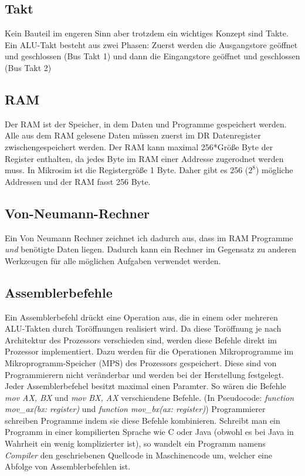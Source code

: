 \documentclass{article}
\begin{document}
\subsection*{Takt}
Kein Bauteil im engeren Sinn aber trotzdem ein wichtiges Konzept sind Takte.
Ein ALU-Takt besteht aus zwei Phasen: Zuerst werden die Ausgangstore geöffnet und geschlossen (Bus Takt 1)
und dann die Eingangstore geöffnet und geschlossen (Bus Takt 2)
\subsection*{RAM}
Der RAM ist der Speicher, in dem Daten und Programme gespeichert werden. Alle aus dem RAM gelesene Daten
müssen zuerst im DR Datenregister zwischengespeichert werden. Der RAM kann maximal 256*Größe Byte der Register 
enthalten, da jedes Byte im RAM einer Addresse zugerodnet werden muss. In Mikrosim ist die Registergröße 1 Byte.
Daher gibt es 256 ($2^8$) mögliche Addressen und der RAM fasst 256 Byte.

\subsection*{Von-Neumann-Rechner}
Ein Von Neumann Rechner zeichnet ich dadurch aus, dass im RAM Programme \emph{und} benötigte Daten liegen.
Dadurch kann ein Rechner im Gegensatz zu anderen Werkzeugen für alle möglichen Aufgaben verwendet werden.

\subsection*{Assemblerbefehle}
Ein Assemblerbefehl drückt eine Operation aus, die in einem oder mehreren ALU-Takten durch Toröffnungen realisiert wird.
Da diese Toröffnung je nach Architektur des Prozessors verschieden sind, werden diese Befehle direkt im Prozessor implementiert.
Dazu werden für die Operationen Mikroprogramme im Mikroprogramm-Speicher (MPS) des Prozessors gespeichert. Diese sind von
Programmierern nicht veränderbar und werden bei der Herstellung festgelegt. Jeder Assemblerbefehel besitzt maximal einen Paramter.
So wären die Befehle \emph{mov AX, BX} und \emph{mov BX, AX} verschiendene Befehle.
(In Pseudocode: \textit{function mov\_ax(bx: register)} und \textit{function mov\_bx(ax: register)})
Programmierer schreiben Programme indem sie diese Befehle kombinieren. Schreibt man ein Programm in einer kompilierten Sprache
wie C oder Java (obwohl es bei Java in Wahrheit ein wenig komplizierter ist), so wandelt ein Programm namens \emph{Compiler}
den geschriebenen Quellcode in Maschinencode um, welcher eine Abfolge von Assemblerbefehlen ist.
\end{document}
